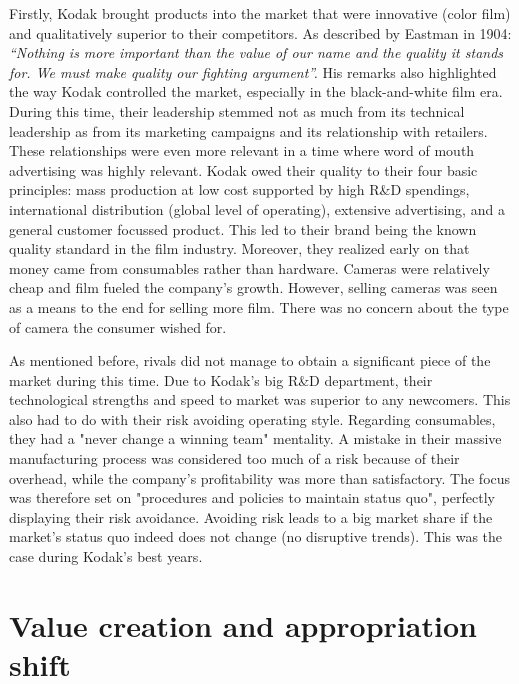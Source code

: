 \documentclass[a4paper,10pt,UTF8]{scrartcl}
\begin{document}
Firstly, Kodak brought products into the market that were innovative (color film) 
and qualitatively superior to their competitors. As described by Eastman in 1904: 
\textit{“Nothing is more important than the value of our name and the quality it stands for. 
We must make quality our fighting argument”.} His remarks also highlighted the way 
Kodak controlled the market, especially in the black-and-white film era. 
During this time, their leadership stemmed not as much from its technical 
leadership as from its marketing campaigns and its relationship with retailers. 
These relationships were even more relevant in a time where word of mouth 
advertising was highly relevant. Kodak owed their quality to their four basic 
principles: mass production at low cost supported by high R\&D spendings, 
international distribution (global level of operating), extensive advertising, 
and a general customer focussed product. This led to their brand being the 
known quality standard in the film industry. Moreover, they realized early 
on that money came from consumables rather than hardware. Cameras were 
relatively cheap and film fueled the company's growth. However, selling 
cameras was seen as a means to the end for selling more film. There was 
no concern about the type of camera the consumer wished for.

As mentioned before, rivals did not manage to obtain a significant piece of the 
market during this time. Due to Kodak's big R\&D department, their technological 
strengths and speed to market was superior to any newcomers. This also had to do 
with their risk avoiding operating style. Regarding consumables, they had a 
"never change a winning team" mentality. A mistake in their massive manufacturing 
process was considered too much of a risk because of their overhead, while the 
company's profitability was more than satisfactory. The focus was therefore set 
on "procedures and policies to maintain status quo", perfectly displaying their 
risk avoidance. Avoiding risk leads to a big market share if the market's status 
quo indeed does not change (no disruptive trends). This was the case during 
Kodak's best years.



\section{Value creation and appropriation shift}
\end{document}
